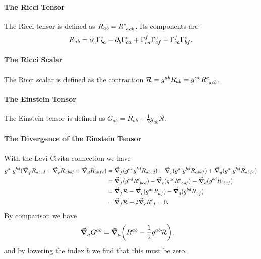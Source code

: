 \paragraph{The Ricci Tensor}
The Ricci tensor is defined as $R_{ab} = \tensor{R}{^{c}_{acb}}$. Its components are
\begin{align*}
	R_{ab} = \del{c}{\chris{c}{b}{a}} - \del{b}{\chris{c}{c}{a}} + \chris{f}{b}{a}\chris{c}{c}{f} - \chris{f}{c}{a}\chris{c}{b}{f} .
\end{align*}

\paragraph{The Ricci Scalar}
The Ricci scalar is defined as the contraction $\mathcal{R} = g^{ab}R_{ab} = g^{ab}\tensor{R}{^{c}_{acb}}$.

\paragraph{The Einstein Tensor}
The Einstein tensor is defined as $G_{ab} = R_{ab} - \frac{1}{2}g_{ab}\mathcal{R}$.

\paragraph{The Divergence of the Einstein Tensor}
With the Levi-Civita connection we have
\begin{align*}
	g^{ac}g^{bd}(\dcov{f}{R_{abcd}} + \dcov{c}{R_{abdf}} + \dcov{d}{R_{abfc}}) &= \dcov{f}{(g^{ac}g^{bd}R_{abcd})} + \dcov{c}{(g^{ac}g^{bd}R_{abdf})} + \dcov{d}{(g^{ac}g^{bd}R_{abfc})} \\
	&= \dcov{f}{(g^{bd}\tensor{R}{^{c}_{bcd}})} - \dcov{c}{(g^{ac}\tensor{R}{^{d}_{adf}})} - \dcov{d}{(g^{bd}\tensor{R}{^{c}_{bcf}})} \\
	&= \dcov{f}{\R} - \dcov{c}{(g^{ac}\tensor{R}{_{af}})} - \dcov{d}{(g^{bd}\tensor{R}{_{bf}})} \\
	&= \dcov{f}{\R} - 2\dcov{c}{\tensor{R}{^{c}_{f}}} = 0.
\end{align*}
By comparison we have
\begin{align*}
	\grad_{a}^{}{G^{ab}} &= \grad_{a}^{}{\left(R^{ab} - \frac{1}{2}g^{ab}\mathcal{R}\right)},
\end{align*}
and by lowering the index $b$ we find that this must be zero.

